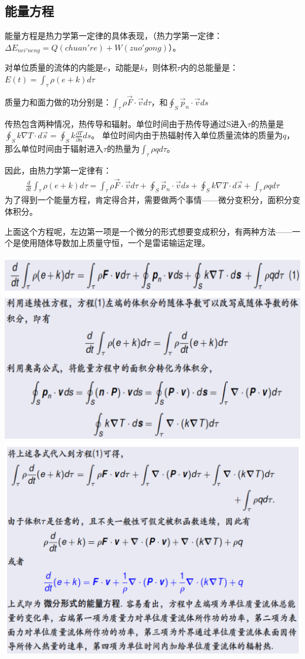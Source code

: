 \documentclass[UTF8,12pt]{article}
\begin{document}
\subsection{能量方程}

能量方程是热力学第一定律的具体表现，（热力学第一定律：$\Delta E_{nei'neng} = Q(chuan're)+W(zuo'gong)$）。

对单位质量的流体的内能是$e$，动能是$k$，则体积$\tau$内的总能量是：$E(t) = \int_{\tau} \rho (e+k) d\tau$

质量力和面力做的功分别是：$\int _{\tau} \rho \vec F \cdot \vec v d \tau $，和$\oint _S \vec p_n \cdot \vec v ds$

传热包含两种情况，热传导和辐射。单位时间由于热传导通过S进入$\tau$的热量是$\oint _S k \nabla T \cdot d\vec s = \oint_S k \frac{\partial T}{\partial n} ds$。
单位时间内由于热辐射传入单位质量流体的质量为$q$，那么单位时间由于辐射进入$\tau$的热量为$\int_{\tau} \rho q d \tau$。

因此，由热力学第一定律有：
\begin{align*}
    \frac{d}{dt} \int_{\tau} \rho (e+k) d\tau
      = \int _{\tau} \rho \vec F \cdot \vec v d \tau
      + \oint _S \vec p_n \cdot \vec v ds
      + \oint _S k \nabla T \cdot d\vec s
      + \int_{\tau} \rho q d \tau
\end{align*}
为了得到一个能量方程，肯定得合并，需要做两个事情——微分变积分，面积分变体积分。

上面这个方程呢，左边第一项是一个微分的形式想要变成积分，有两种方法——一个是使用随体导数加上质量守恒，一个是雷诺输运定理。

\begin{center}
    \includegraphics[width=0.8\linewidth]{img/energy1.png}
    \includegraphics[width=0.8\linewidth]{img/energy2.png}
\end{center}
\end{document}
